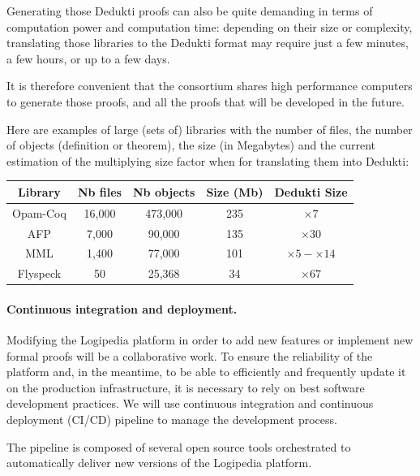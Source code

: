 Generating those Dedukti proofs can also be quite demanding in terms
of computation power and computation time: depending on their size or
complexity, translating those libraries to the Dedukti format may
require just a few minutes, a few hours, or up to a few days.

It is therefore convenient that the consortium shares high performance
computers to generate those proofs, and all the proofs that will
be developed in the future.

Here are examples of large (sets of) libraries with the number of
files, the number of objects (definition or theorem), the size (in
Megabytes) and the current estimation of the multiplying size factor
when for translating them into Dedukti:

\begin{center}
\begin{tabular}{|c|c|c|c|c|}\hline
\rowcolor{color2}Library & Nb files & Nb objects & Size (Mb) & Dedukti Size\\\hline
Opam-Coq & 16,000 & 473,000 & 235 & $\times 7$\\\hline
AFP & 7,000 & 90,000 & 135 & $\times 30$\\\hline
MML & 1,400 & 77,000 & 101 & $\times 5-\times 14$\\\hline
Flyspeck & 50 & 25,368 & 34 & $\times 67$\\\hline
\end{tabular}
\end{center}

\paragraph*{Continuous integration and deployment.}

Modifying the Logipedia platform in order to add new features or
implement new formal proofs will be a collaborative work. To ensure
the reliability of the platform and, in the meantime, to be able to
efficiently and frequently update it on the production infrastructure,
it is necessary to rely on best software development practices.  We
will use continuous integration and continuous deployment (CI/CD)
pipeline to manage the development process.

The pipeline is composed of several open source tools orchestrated
to automatically deliver new versions of the Logipedia platform.

